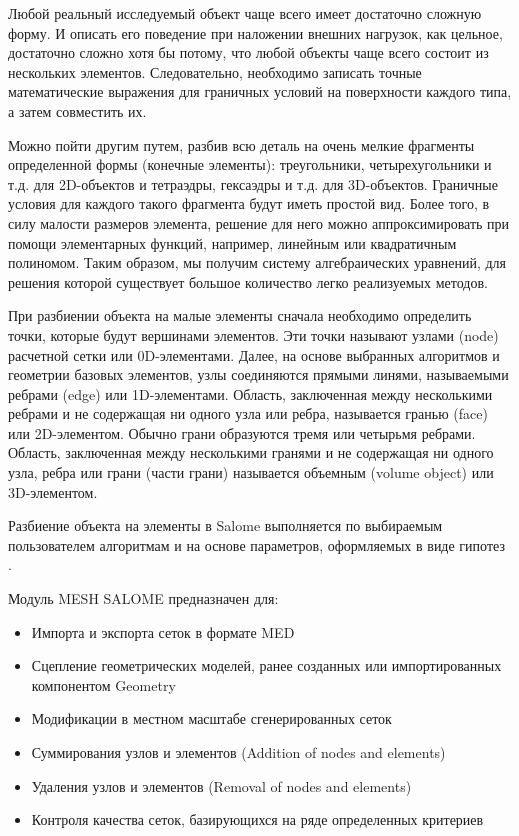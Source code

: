 \documentclass[a4paper,12pt]{article}
\theoremstyle{plain} %
\theoremstyle{definition} %
\theoremstyle{remark} %
\begin{document}
	Любой реальный исследуемый объект чаще всего имеет достаточно сложную форму. И описать его поведение при наложении внешних нагрузок, как цельное, достаточно сложно хотя бы потому, что любой объекты чаще всего состоит из нескольких элементов. Следовательно, необходимо записать точные математические выражения для граничных условий на поверхности каждого типа, а затем совместить их.
		
	Можно пойти другим путем, разбив всю деталь на очень мелкие фрагменты определенной формы (конечные элементы): треугольники, четырехугольники и т.д. для 2D-объектов и тетраэдры, гексаэдры и т.д. для 3D-объектов. Граничные условия для каждого такого фрагмента будут иметь простой вид. Более того, в силу малости размеров элемента, решение для него можно аппроксимировать при помощи элементарных функций, например, линейным или квадратичным полиномом. Таким образом, мы получим систему алгебраических уравнений, для решения которой существует большое количество легко реализуемых методов.
		
	При разбиении объекта на малые элементы сначала необходимо определить точки, которые будут вершинами элементов. Эти точки называют узлами (node) расчетной сетки или 0D-элементами. Далее, на основе выбранных алгоритмов и геометрии базовых элементов, узлы соединяются прямыми линями, называемыми ребрами (edge) или 1D-элементами. Область, заключенная между несколькими ребрами и не содержащая ни одного узла или ребра, называется гранью (face) или 2D-элементом. Обычно грани образуются тремя или четырьмя ребрами. Область, заключенная между несколькими гранями и не содержащая ни одного узла, ребра или грани (части грани) называется объемным (volume object) или 3D-элементом.
		
	Разбиение объекта на элементы в Salome выполняется по выбираемым пользователем алгоритмам и на основе параметров, оформляемых в виде гипотез \cite{wIbmSalomeMesh}.
		
	Модуль MESH SALOME предназначен для\cite{wOfDoc}:
	\begin{itemize}
		\item Импорта и экспорта сеток в формате MED
		\item Сцепление геометрических моделей, ранее созданных или импортированных компонентом Geometry
		\item Модификации в местном масштабе сгенерированных сеток
		\item Суммирования узлов и элементов (Addition of nodes and elements)
		\item Удаления узлов и элементов (Removal of nodes and elements)
		\item Контроля качества сеток, базирующихся на ряде определенных критериев
	\end{itemize}
		
	\newpage
	
\end{document}
